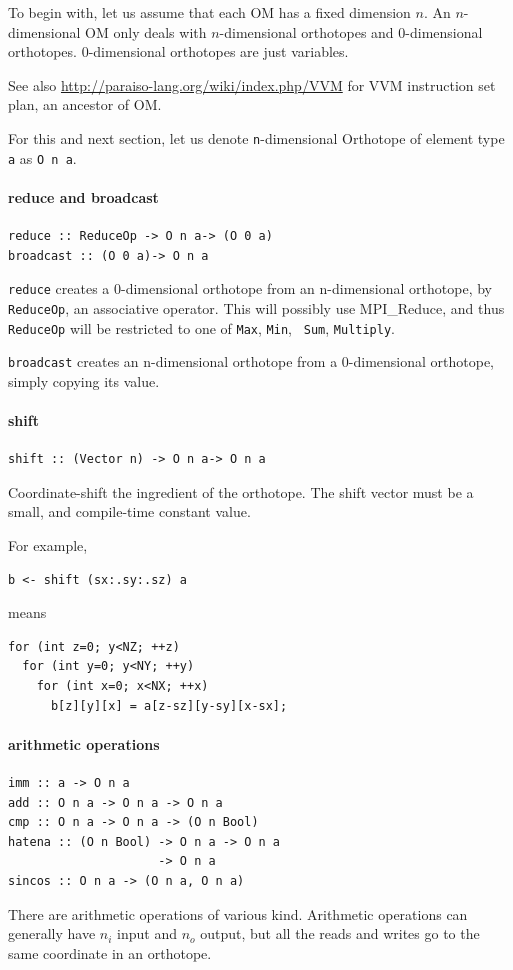 \documentclass[twocolumn]{article}
\begin{document}
To begin with, let us assume that each OM has a fixed dimension $n$. An
$n$-dimensional OM only deals with $n$-dimensional orthotopes and
0-dimensional orthotopes. 0-dimensional orthotopes are just variables.

See also \url{http://paraiso-lang.org/wiki/index.php/VVM} for VVM instruction
set plan, an ancestor of OM.

For this and next section, let us denote {\tt n}-dimensional Orthotope of
element type {\tt a} as {\tt O n a}.

\paragraph{reduce and broadcast}
\begin{verbatim}
reduce :: ReduceOp -> O n a-> (O 0 a)
broadcast :: (O 0 a)-> O n a
\end{verbatim}
{\tt reduce} creates a 0-dimensional orthotope from an n-dimensional orthotope, by {\tt
  ReduceOp}, an associative operator. This will possibly use MPI\_Reduce, and
thus {\tt ReduceOp} will be restricted to one of {\tt Max}, {\tt Min}, {\tt
  Sum}, {\tt Multiply}.

{\tt broadcast} creates an n-dimensional orthotope from a 0-dimensional
orthotope, simply copying its value.

\paragraph{shift}
\begin{verbatim}
shift :: (Vector n) -> O n a-> O n a
\end{verbatim}
Coordinate-shift the ingredient of the orthotope.  The shift vector must be a
small, and compile-time constant value.

For example, 
\begin{verbatim}
b <- shift (sx:.sy:.sz) a
\end{verbatim}
means
\begin{verbatim}
for (int z=0; y<NZ; ++z) 
  for (int y=0; y<NY; ++y) 
    for (int x=0; x<NX; ++x) 
      b[z][y][x] = a[z-sz][y-sy][x-sx];
\end{verbatim}

\paragraph{arithmetic operations}
\begin{verbatim}
imm :: a -> O n a
add :: O n a -> O n a -> O n a
cmp :: O n a -> O n a -> (O n Bool)
hatena :: (O n Bool) -> O n a -> O n a
                     -> O n a
sincos :: O n a -> (O n a, O n a)
\end{verbatim}
There are arithmetic operations of various kind. Arithmetic operations can
generally have $n_i$ input and $n_o$ output, but all the reads and writes go
to the same coordinate in an orthotope. 
\end{document}
